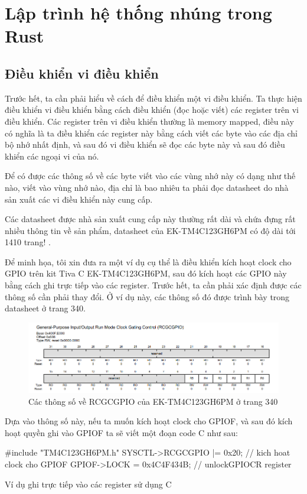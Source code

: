 \chapter{Lập trình hệ thống nhúng trong Rust}
\section{Điều khiển vi điều khiển}
Trước hết, ta cần phải hiểu về cách để điều khiển một vi điều khiển.
Ta thực hiện điều khiển vi điều khiển bằng cách điều khiển (đọc hoặc viết) các register trên vi điều khiển.
Các register trên vi điều khiển thường là memory mapped, điều này có nghĩa là ta điều khiển các register này bằng cách viết các byte vào các địa chỉ bộ nhớ nhất định, và sau đó vi điều khiển sẽ đọc các byte này và sau đó điều khiển các ngoại vi của nó.

Để có được các thông số về các byte viết vào các vùng nhớ này có dạng như thế nào, viết vào vùng nhớ nào, địa chỉ là bao nhiêu ta phải đọc datasheet do nhà sản xuất các vi điều khiển này cung cấp.

Các datasheet được nhà sản xuất cung cấp này thường rất dài và chứa đựng rất nhiều thông tin về sản phẩm, datasheet của EK-TM4C123GH6PM có độ dài tới 1410 trang! \cite{tivac_datasheet}.

Để minh họa, tôi xin đưa ra một ví dụ cụ thể là điều khiển kích hoạt clock cho GPIO trên kit Tiva C EK-TM4C123GH6PM, sau đó kích hoạt các GPIO này bằng cách ghi trực tiếp vào các register.
Trước hết, ta cần phải xác định được các thông số cần phải thay đổi. Ở ví dụ này, các thông số đó được trình bày trong datasheet ở trang 340.
\begin{figure}[ht]
\centering
\includegraphics[scale=0.5]{images/tivac_datasheet_example.png}
\caption{Các thông số về RCGCGPIO của EK-TM4C123GH6PM ở trang 340}
\end{figure}

Dựa vào thông số này, nếu ta muốn kích hoạt clock cho GPIOF, và sau đó kích hoạt quyền ghi vào GPIOF ta sẽ viết một đoạn code C như sau:
\begin{listing}[ht]
\begin{ccode}
#include "TM4C123GH6PM.h"
SYSCTL->RCGCGPIO |= 0x20; // kich hoat clock cho GPIOF
GPIOF->LOCK = 0x4C4F434B; // unlockGPIOCR register
\end{ccode}
\caption{Ví dụ ghi trực tiếp vào các register sử dụng C}
\end{listing}

